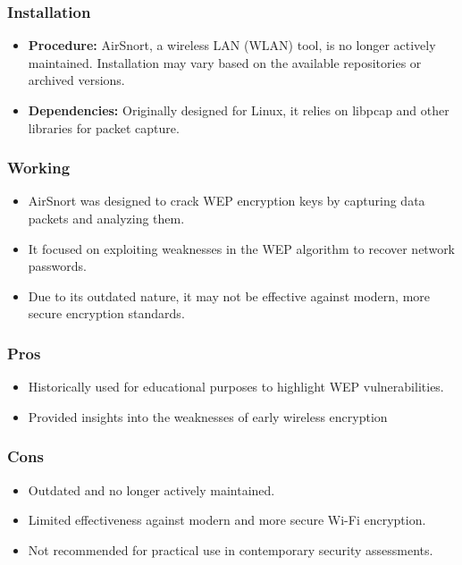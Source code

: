\documentclass[11pt]{article}
\begin{document}
\subsubsection{Installation}
\begin{itemize}
	\item \textbf{Procedure:} AirSnort, a wireless LAN (WLAN) tool, is no longer actively maintained. Installation may vary based on the available repositories or archived versions.
	\item \textbf{Dependencies:} Originally designed for Linux, it relies on libpcap and other libraries for packet capture.
\end{itemize}

\subsubsection{Working}
\begin{itemize}
	\item AirSnort was designed to crack WEP encryption keys by capturing data packets
	      and analyzing them.
	\item It focused on exploiting weaknesses in the WEP algorithm to recover network
	      passwords.
	\item Due to its outdated nature, it may not be effective against modern, more secure
	      encryption standards.
\end{itemize}

\subsubsection{Pros}
\begin{itemize}
	\item Historically used for educational purposes to highlight WEP vulnerabilities.
	\item Provided insights into the weaknesses of early wireless encryption
\end{itemize}

\subsubsection{Cons}
\begin{itemize}
	\item Outdated and no longer actively maintained.
	\item Limited effectiveness against modern and more secure Wi-Fi encryption.
	\item Not recommended for practical use in contemporary security assessments.
\end{itemize}
\end{document}
